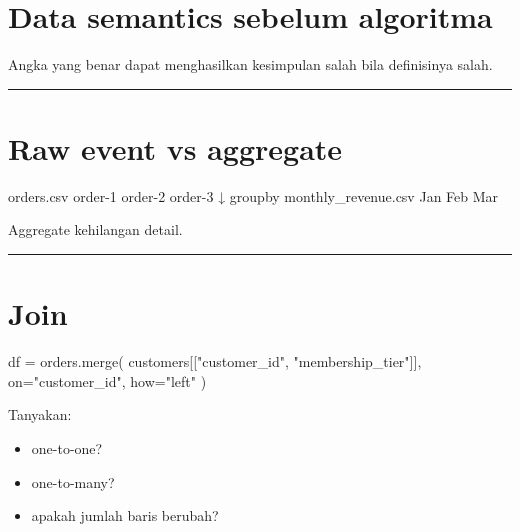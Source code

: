 \documentclass[
  indonesian,
  letterpaper,
  DIV=11,
  numbers=noendperiod]{scrreprt}
\newenvironment{Shaded}{\begin{snugshade}}{\end{snugshade}}
\newcommand{\NormalTok}[1]{\textcolor[rgb]{0.00,0.23,0.31}{#1}}
\newcommand{\OperatorTok}[1]{\textcolor[rgb]{0.37,0.37,0.37}{#1}}
\newcommand{\StringTok}[1]{\textcolor[rgb]{0.13,0.47,0.30}{#1}}
\providecommand{\tightlist}{%
  \setlength{\itemsep}{0pt}\setlength{\parskip}{0pt}}
\begin{document}
\section{Data semantics sebelum
algoritma}\label{data-semantics-sebelum-algoritma}

Angka yang benar dapat menghasilkan kesimpulan salah bila definisinya
salah.

\begin{center}\rule{0.5\linewidth}{0.5pt}\end{center}

\section{Raw event vs aggregate}\label{raw-event-vs-aggregate}

\begin{Shaded}
\begin{Highlighting}[]
\NormalTok{orders.csv}
\NormalTok{  order{-}1}
\NormalTok{  order{-}2}
\NormalTok{  order{-}3}
\NormalTok{     ↓ groupby}
\NormalTok{monthly\_revenue.csv}
\NormalTok{  Jan}
\NormalTok{  Feb}
\NormalTok{  Mar}
\end{Highlighting}
\end{Shaded}

Aggregate kehilangan detail.

\begin{center}\rule{0.5\linewidth}{0.5pt}\end{center}

\section{Join}\label{join}

\begin{Shaded}
\begin{Highlighting}[]
\NormalTok{df }\OperatorTok{=}\NormalTok{ orders.merge(}
\NormalTok{    customers[[}\StringTok{"customer\_id"}\NormalTok{, }\StringTok{"membership\_tier"}\NormalTok{]],}
\NormalTok{    on}\OperatorTok{=}\StringTok{"customer\_id"}\NormalTok{,}
\NormalTok{    how}\OperatorTok{=}\StringTok{"left"}
\NormalTok{)}
\end{Highlighting}
\end{Shaded}

Tanyakan:

\begin{itemize}
\tightlist
\item
  one-to-one?
\item
  one-to-many?
\item
  apakah jumlah baris berubah?
\end{itemize}
\end{document}
